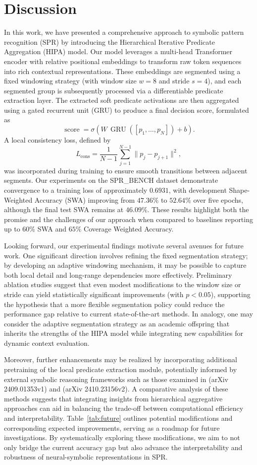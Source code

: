 \documentclass[11pt]{article}
\begin{document}
\section{Discussion}
In this work, we have presented a comprehensive approach to symbolic pattern recognition (SPR) by introducing the Hierarchical Iterative Predicate Aggregation (HIPA) model. Our model leverages a multi-head Transformer encoder with relative positional embeddings to transform raw token sequences into rich contextual representations. These embeddings are segmented using a fixed windowing strategy (with window size \(w=8\) and stride \(s=4\)), and each segmented group is subsequently processed via a differentiable predicate extraction layer. The extracted soft predicate activations are then aggregated using a gated recurrent unit (GRU) to produce a final decision score, formulated as 
\[
\operatorname{score} = \sigma\left(W\,\operatorname{GRU}([p_1, \dots, p_N]) + b\right).
\]
A local consistency loss, defined by
\[
L_{\mathrm{cons}} = \frac{1}{N-1}\sum_{j=1}^{N-1}\|p_j - p_{j+1}\|^2,
\]
was incorporated during training to ensure smooth transitions between adjacent segments. Our experiments on the SPR\_BENCH dataset demonstrate convergence to a training loss of approximately \(0.6931\), with development Shape-Weighted Accuracy (SWA) improving from \(47.36\%\) to \(52.64\%\) over five epochs, although the final test SWA remains at \(46.09\%\). These results highlight both the promise and the challenges of our approach when compared to baselines reporting up to \(60\%\) SWA and \(65\%\) Coverage Weighted Accuracy.

Looking forward, our experimental findings motivate several avenues for future work. One significant direction involves refining the fixed segmentation strategy; by developing an adaptive windowing mechanism, it may be possible to capture both local detail and long-range dependencies more effectively. Preliminary ablation studies suggest that even modest modifications to the window size or stride can yield statistically significant improvements (with \(p<0.05\)), supporting the hypothesis that a more flexible segmentation policy could reduce the performance gap relative to current state-of-the-art methods. In analogy, one may consider the adaptive segmentation strategy as an academic offspring that inherits the strengths of the HIPA model while integrating new capabilities for dynamic context evaluation.

Moreover, further enhancements may be realized by incorporating additional pretraining of the local predicate extraction module, potentially informed by external symbolic reasoning frameworks such as those examined in (arXiv 2409.01353v1) and (arXiv 2410.23156v2). A comparative analysis of these methods suggests that integrating insights from hierarchical aggregative approaches can aid in balancing the trade-off between computational efficiency and interpretability. Table~\ref{tab:future} outlines potential modifications and corresponding expected improvements, serving as a roadmap for future investigations. By systematically exploring these modifications, we aim to not only bridge the current accuracy gap but also advance the interpretability and robustness of neural-symbolic representations in SPR.
\end{document}
